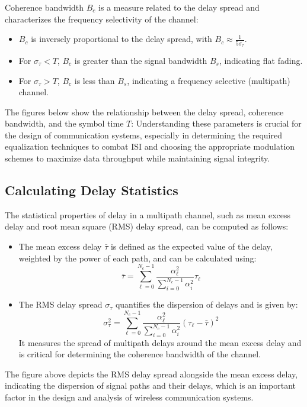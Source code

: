 Coherence bandwidth \( B_c \) is a measure related to the delay spread and characterizes the frequency selectivity of the channel:

\begin{itemize}
    \item \( B_c \) is inversely proportional to the delay spread, with \( B_c \approx \frac{1}{5\sigma_{\tau}} \).
    \item For \( \sigma_{\tau} < T \), \( B_c \) is greater than the signal bandwidth \( B_s \), indicating flat fading.
    \item For \( \sigma_{\tau} > T \), \( B_c \) is less than \( B_s \), indicating a frequency selective (multipath) channel.
\end{itemize}

The figures below show the relationship between the delay spread, coherence bandwidth, and the symbol time \( T \):
Understanding these parameters is crucial for the design of communication systems, especially in determining the required equalization techniques to combat ISI and choosing the appropriate modulation schemes to maximize data throughput while maintaining signal integrity.

\subsection*{Calculating Delay Statistics}

The statistical properties of delay in a multipath channel, such as mean excess delay and root mean square (RMS) delay spread, can be computed as follows:

\begin{itemize}
    \item The mean excess delay \( \bar{\tau} \) is defined as the expected value of the delay, weighted by the power of each path, and can be calculated using:
    \[
    \bar{\tau} = \sum_{\ell=0}^{N_c-1} \frac{\alpha_{\ell}^2}{\sum_{i=0}^{N_c-1} \alpha_{i}^2} \tau_{\ell}
    \]
    
    \item The RMS delay spread \( \sigma_{\tau} \) quantifies the dispersion of delays and is given by:
    \[
    \sigma_{\tau}^2 = \sum_{\ell=0}^{N_c-1} \frac{\alpha_{\ell}^2}{\sum_{i=0}^{N_c-1} \alpha_{i}^2} (\tau_{\ell} - \bar{\tau})^2
    \]
    It measures the spread of multipath delays around the mean excess delay and is critical for determining the coherence bandwidth of the channel.
\end{itemize}
The figure above depicts the RMS delay spread alongside the mean excess delay, indicating the dispersion of signal paths and their delays, which is an important factor in the design and analysis of wireless communication systems.


